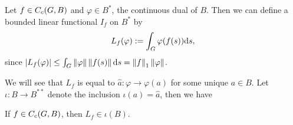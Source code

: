 \begin{definition}
	Let $f \in C_c(G,B)$ and $\varphi \in B^*$, the continuous dual of $B$. Then we can define a bounded linear functional $I_f$ on $B^*$ by
	\begin{align*}
		L_f(\varphi) := \int_G \varphi(f(s)) \mathrm{d} s,
	\end{align*}
	since $| L_f(\varphi)| \leq \int_G \left\lVert \varphi \right\rVert \left\lVert f(s) \right\rVert \mathrm{d} s = \left\lVert f \right\rVert_1 \left\lVert \varphi\right\rVert$.
\end{definition}
We will see that $L_f$ is equal to $\hat a \colon \varphi \to \varphi(a)$ for some unique $a \in B$. Let $\iota \colon B \to B^{**}$ denote the inclusion $\iota(a) = \hat a$, then we have
\begin{lemma}
	If $f \in C_c(G,B)$, then $L_f \in \iota(B)$.
	\label{cross:defintegral}
\end{lemma}
